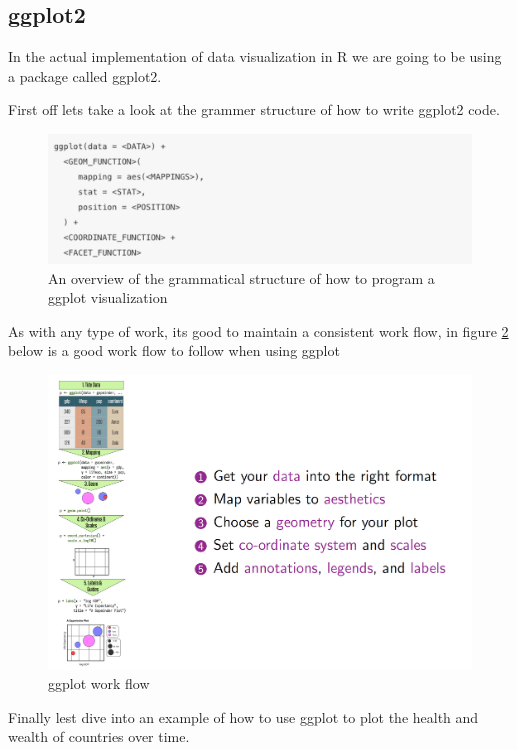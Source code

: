 \documentclass{article}
\begin{document}
\subsection{ggplot2}
\begin{flushleft}
In the actual implementation of data visualization in R we are going to be using a package called ggplot2. 
\end{flushleft}
\begin{flushleft}
First off lets take a look at the grammer structure of how to write ggplot2 code.
\end{flushleft}
\begin{figure}[H]
    \centering
    \includegraphics[width=.75\textwidth]{ggplot2_grammar.png}
    \caption{An overview of the grammatical structure of how to program a ggplot visualization}
    \label{fig:ggplot2_grammar}
\end{figure}
\begin{flushleft}
As with any type of work, its good to maintain a consistent work flow, in figure \ref{fig:ggplot_workflow} below is a good work flow to follow when using ggplot 
\end{flushleft}
\begin{figure}[H]
    \centering
    \includegraphics[width=.75\textwidth]{ggplot_workflow.png}
    \caption{ggplot work flow}
    \label{fig:ggplot_workflow}
\end{figure}
\begin{flushleft}
Finally lest dive into an example of how to use ggplot to plot the health and wealth of countries over time. 
\end{flushleft}
\end{document}
